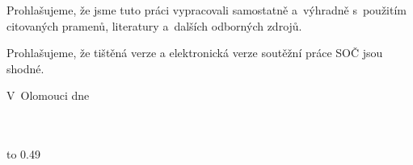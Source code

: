 \noindent
Prohlašujeme, že jsme tuto práci vypracovali samostatně a~výhradně
s~použitím citovaných pramenů, literatury a~dalších odborných zdrojů.

Prohlašujeme, že tištěná verze a elektronická verze soutěžní práce SOČ jsou
shodné.

\vspace{20mm}
\noindent
V~Olomouci dne \makebox[2.5cm]{\dotfill}
\hspace*{\fill}
\makebox[5cm]{\dotfill}
\hspace*{\fill}
\\
\\
\\
\makebox[5.55cm]{}
\hspace*{\fill}
\makebox[5cm]{\dotfill}
\hspace*{\fill}



\newpage
\nobreak\vbox to 0.49


